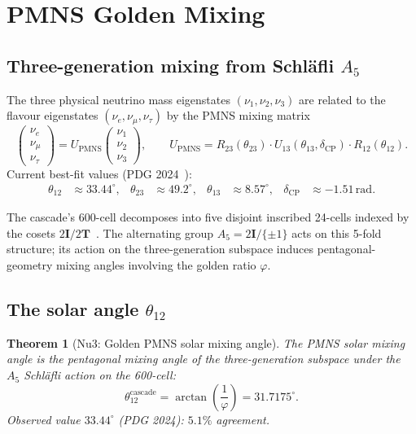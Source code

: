 \documentclass[12pt]{article}
\newtheorem{theorem}{Theorem}
\theoremstyle{definition}
\theoremstyle{remark}
\newcommand{\twoI}{2\mathbf{I}}
\newcommand{\twoT}{2\mathbf{T}}
\begin{document}
\section{PMNS Golden Mixing}\label{sec:pmns}

\subsection{Three-generation mixing from Schl\"afli $A_5$}

The three physical neutrino mass eigenstates $(\nu_1, \nu_2, \nu_3)$ are related to the flavour eigenstates $(\nu_e, \nu_\mu, \nu_\tau)$ by the PMNS mixing matrix
\begin{equation}
\begin{pmatrix} \nu_e \\ \nu_\mu \\ \nu_\tau \end{pmatrix} = U_{\mathrm{PMNS}} \begin{pmatrix} \nu_1 \\ \nu_2 \\ \nu_3 \end{pmatrix}, \qquad U_{\mathrm{PMNS}} = R_{23}(\theta_{23}) \cdot U_{13}(\theta_{13}, \delta_{\mathrm{CP}}) \cdot R_{12}(\theta_{12}).
\end{equation}
Current best-fit values (PDG 2024~\citep{PDG2024}):
\begin{align}
\theta_{12} &\approx 33.44^\circ, & \theta_{23} &\approx 49.2^\circ, & \theta_{13} &\approx 8.57^\circ, & \delta_{\mathrm{CP}} &\approx -1.51 \,\mathrm{rad}.
\end{align}

The cascade's 600-cell decomposes into five disjoint inscribed 24-cells indexed by the cosets $\twoI / \twoT$~\citep{SmartXXXV, SmartXXXVI}. The alternating group $A_5 = \twoI / \{\pm 1\}$ acts on this 5-fold structure; its action on the three-generation subspace induces pentagonal-geometry mixing angles involving the golden ratio $\varphi$.

\subsection{The solar angle $\theta_{12}$}

\begin{theorem}[Nu3: Golden PMNS solar mixing angle]\label{prop:theta12}
The PMNS solar mixing angle is the pentagonal mixing angle of the three-generation subspace under the $A_5$ Schl\"afli action on the 600-cell:
\begin{equation}\label{eq:theta12}
\theta_{12}^{\mathrm{cascade}} = \arctan\!\left(\frac{1}{\varphi}\right) = 31.7175^\circ.
\end{equation}
Observed value $33.44^\circ$ (PDG 2024): $5.1\%$ agreement.
\end{theorem}
\end{document}
